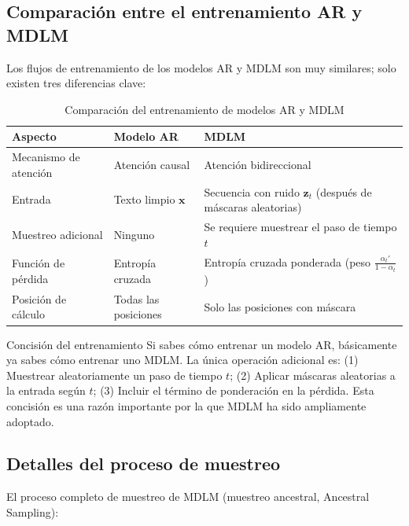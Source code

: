 \subsection{Comparación entre el entrenamiento AR y MDLM}

Los flujos de entrenamiento de los modelos AR y MDLM son muy similares; solo existen tres diferencias clave:

\begin{table}[H]
\centering
\caption{Comparación del entrenamiento de modelos AR y MDLM}
\begin{tabular}{@{}lll@{}}
\toprule
\textbf{Aspecto} & \textbf{Modelo AR} & \textbf{MDLM} \\
\midrule
Mecanismo de atención & Atención causal & Atención bidireccional \\
Entrada & Texto limpio $\mathbf{x}$ & Secuencia con ruido $\mathbf{z}_t$ (después de máscaras aleatorias) \\
Muestreo adicional & Ninguno & Se requiere muestrear el paso de tiempo $t$ \\
Función de pérdida & Entropía cruzada & Entropía cruzada ponderada (peso $\frac{\alpha_t'}{1-\alpha_t}$) \\
Posición de cálculo & Todas las posiciones & Solo las posiciones con máscara \\
\bottomrule
\end{tabular}
\end{table}

\begin{knowledgebox}{Concisión del entrenamiento}
Si sabes cómo entrenar un modelo AR, básicamente ya sabes cómo entrenar uno MDLM. La única operación adicional es: (1) Muestrear aleatoriamente un paso de tiempo $t$; (2) Aplicar máscaras aleatorias a la entrada según $t$; (3) Incluir el término de ponderación en la pérdida. Esta concisión es una razón importante por la que MDLM ha sido ampliamente adoptado.
\end{knowledgebox}

\subsection{Detalles del proceso de muestreo}

El proceso completo de muestreo de MDLM (muestreo ancestral, Ancestral Sampling):

